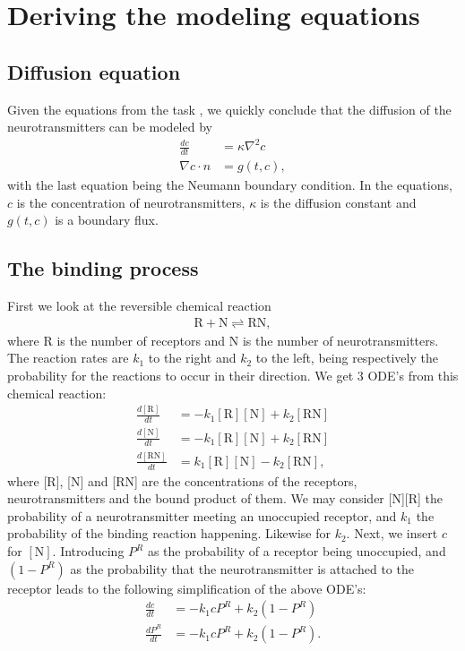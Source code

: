 

\section{Deriving the modeling equations}
\subsection*{Diffusion equation}
Given the equations from the task \cite{task}, we quickly conclude that the diffusion of the neurotransmitters can be modeled by
\begin{align}
\label{eq:diffusion}
\frac{dc}{dt} &= \kappa \nabla^2 c \\
\label{eq:BC}
\nabla c \cdot n &= g(t,c),
\end{align}
with the last equation being the Neumann boundary condition. In the equations, $c$ is the concentration of neurotransmitters, $\kappa$ is the diffusion constant and $g(t,c)$ is a boundary flux.


\subsection{The binding process}
First we look at the reversible chemical reaction
\begin{align}
\label{eq:boundNeurotransmitter}
\text{R} + \text{N} \rightleftharpoons \text{RN},
\end{align}
where R is the number of receptors and N is the number of neurotransmitters.
The reaction rates are $k_1$ to the right and $k_2$ to the left, being respectively the probability for the reactions to occur in their direction. 
We get 3 ODE's from this chemical reaction:
\begin{align*}
\frac{d[\text{R}]}{dt} &= -k_1[\text{R}][\text{N}] + k_2[\text{RN}]\\
\frac{d[\text{N}]}{dt} &= -k_1[\text{R}][\text{N}] + k_2[\text{RN}]\\
\frac{d[\text{RN}]}{dt} &= k_1[\text{R}][\text{N}] - k_2[\text{RN}],
\end{align*}
where [R], [N] and [RN] are the concentrations of the receptors, neurotransmitters and the bound product of them.
We may consider [N][R] the probability of a neurotransmitter meeting an unoccupied receptor, and $k_1$ the probability of the binding reaction happening. Likewise for $k_2$. Next, we insert $c$ for $[\text{N}]$.  Introducing $P^R$ as the probability of a receptor being unoccupied, and $(1-P^R)$ as the probability that the neurotransmitter is attached to the receptor leads to the following simplification \cite{holstad} 
of the above ODE's:
\begin{align}
\label{eq:changeInConcentration}
\frac{dc}{dt} &= -k_1cP^R + k_2(1-P^R)\\
\label{eq:changeInPR}
\frac{dP^R}{dt} &= -k_1cP^R + k_2(1-P^R).
\end{align}

